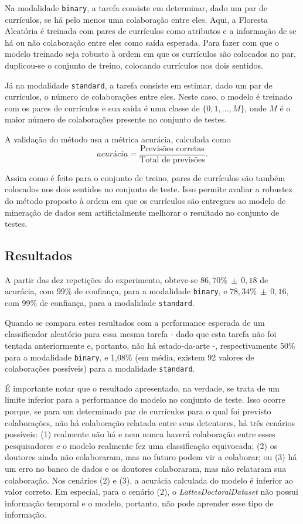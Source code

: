 \documentclass[12pt]{article}
\begin{document}
Na modalidade \texttt{binary}, a tarefa consiste em determinar, dado um par de currículos, se há pelo menos uma colaboração entre eles.
Aqui, a Floresta Aleatória é treinada com pares de currículos como atributos e a informação de se há ou não colaboração entre eles como saída esperada.
Para fazer com que o modelo treinado seja robusto à ordem em que os currículos são colocados no par, duplicou-se o conjunto de treino, colocando currículos nos dois sentidos.

Já na modalidade \texttt{standard}, a tarefa consiste em estimar, dado um par de currículos, o número de colaborações entre eles.
Neste caso, o modelo é treinado com os pares de currículos e sua saída é uma classe de $\{0, 1, ..., M\}$, onde $M$ é o maior número de colaborações presente no conjunto de testes.

A validação do método usa a métrica acurácia, calculada como
\begin{equation}
  \textit{acurácia} = \frac{\text{Previsões corretas}}{\text{Total de previsões}}.
\end{equation}

Assim como é feito para o conjunto de treino, pares de currículos são também colocados nos dois sentidos no conjunto de teste.
Isso permite avaliar a robustez do método proposto à ordem em que os currículos são entregues ao modelo de mineração de dados sem artificialmente melhorar o resultado no conjunto de testes.

\subsection{Resultados}
\label{sec:results}
A partir das dez repetições do experimento, obteve-se $86,70\%~\pm~0,18$ de acurácia, com 99\% de confiança, para a modalidade \texttt{binary}, e $78,34\%~\pm~0,16$, com 99\% de confiança, para a modalidade \texttt{standard}.

Quando se compara estes resultados com a performance esperada de um classificador aleatório para essa mesma tarefa - dado que esta tarefa não foi tentada anteriormente e, portanto, não há estado-da-arte -, respectivamente 50\% para a modalidade \texttt{binary}, e 1,08\% (em média, existem 92 valores de colaborações possíveis) para a modalidade \texttt{standard}.

É importante notar que o resultado apresentado, na verdade, se trata de um limite inferior para a performance do modelo no conjunto de teste.
Isso ocorre porque, se para um determinado par de currículos para o qual foi previsto colaborações, não há colaboração relatada entre seus detentores, há três cenários possíveis: (1) realmente não há e nem nunca haverá colaboração entre esses pesquisadores e o modelo realmente fez uma classificação equivocada; (2) os doutores ainda não colaboraram, mas no futuro podem vir a colaborar; ou (3) há um erro no banco de dados e os doutores colaboraram, mas não relataram sua colaboração.
Nos cenários (2) e (3), a acurácia calculada do modelo é inferior ao valor correto.
Em especial, para o cenário (2), o \emph{LattesDoctoralDataset} não possui informação temporal e o modelo, portanto, não pode aprender esse tipo de informação.
\end{document}

